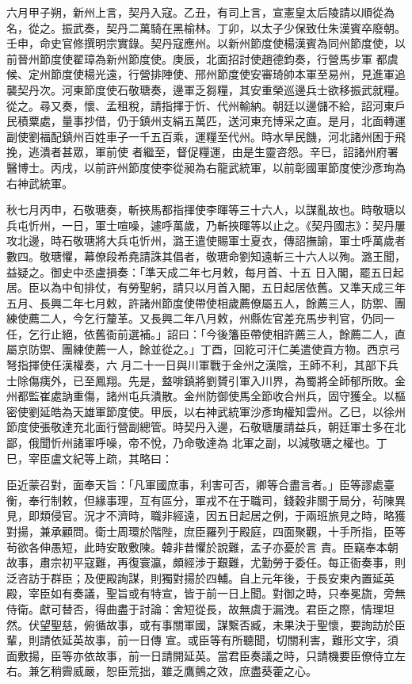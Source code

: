 \begin{pinyinscope}
 六月甲子朔，新州上言，契丹入寇。乙丑，有司上言，宣憲皇太后陵請以順從為名，從之。振武奏，契丹二萬騎在黑榆林。丁卯，以太子少保致仕朱漢賓卒廢朝。壬申，命史官修撰明宗實錄。契丹寇應州。以新州節度使楊漢賓為同州節度使，以前晉州節度使翟璋為新州節度使。庚辰，北面招討使趙德鈞奏，行營馬步軍
 都虞候、定州節度使楊光遠，行營排陣使、邢州節度使安審琦帥本軍至易州，見進軍追襲契丹次。河東節度使石敬瑭奏，邊軍乏芻糧，其安重榮巡邊兵士欲移振武就糧。從之。尋又奏，懷、孟租稅，請指揮于忻、代州輸納。朝廷以邊儲不給，詔河東戶民積粟處，量事抄借，仍于鎮州支絹五萬匹，送河東充博采之直。是月，北面轉運副使劉福配鎮州百姓車子一千五百乘，運糧至代州。時水旱民饑，河北諸州困于飛挽，逃潰者甚眾，軍前使
 者繼至，督促糧運，由是生靈咨怨。辛巳，詔諸州府署醫博士。丙戌，以前許州節度使李從昶為右龍武統軍，以前彰國軍節度使沙彥珣為右神武統軍。



 秋七月丙申，石敬瑭奏，斬挾馬都指揮使李暉等三十六人，以謀亂故也。時敬瑭以兵屯忻州，一日，軍士喧噪，遽呼萬歲，乃斬挾暉等以止之。《契丹國志》：契丹屢攻北邊，時石敬瑭將大兵屯忻州，潞王遣使賜軍士夏衣，傳詔撫諭，軍士呼萬歲者數四。敬瑭懼，幕僚段希堯請誅其倡者，敬瑭命劉知遠斬三十六人以殉。潞王聞，益疑之。御史中丞盧損奏：「準天成二年七月敕，每月首、十五
 日入閣，罷五日起居。臣以為中旬排仗，有勞聖躬，請只以月首入閣，五日起居依舊。又準天成三年五月、長興二年七月敕，許諸州節度使帶使相歲薦僚屬五人，餘薦三人，防禦、團練使薦二人，今乞行釐革。又長興二年八月敕，州縣佐官差充馬步判官，仍同一任，乞行止絕，依舊衙前選補。」詔曰：「今後籓臣帶使相許薦三人，餘薦二人，直屬京防禦、團練使薦一人，餘並從之。」丁酉，回紇可汗仁美遣使貢方物。西京弓弩指揮使任漢權奏，六
 月二十一日與川軍戰于金州之漢陰，王師不利，其部下兵士除傷痍外，已至鳳翔。先是，盩啡鎮將劉贇引軍入川界，為蜀將全師郁所敗。金州都監崔處訥重傷，諸州屯兵潰散。金州防御使馬全節收合州兵，固守獲全。以樞密使劉延皓為天雄軍節度使。甲辰，以右神武統軍沙彥珣權知雲州。乙巳，以徐州節度使張敬達充北面行營副總管。時契丹入邊，石敬瑭屢請益兵，朝廷軍士多在北鄙，俄聞忻州諸軍呼噪，帝不悅，乃命敬達為
 北軍之副，以減敬瑭之權也。丁巳，宰臣盧文紀等上疏，其略曰：



 臣近蒙召對，面奉天旨：「凡軍國庶事，利害可否，卿等合盡言者。」臣等謬處臺衡，奉行制敕，但緣事理，互有區分，軍戎不在于職司，錢穀非關于局分，茍陳異見，即類侵官。況才不濟時，職非經遠，因五日起居之例，于兩班旅見之時，略獲對揚，兼承顧問。衛士周環於階陛，庶臣羅列于殿庭，四面聚觀，十手所指，臣等茍欲各伸愚短，此時安敢敷陳。韓非昔懼於說難，孟子亦憂於言
 責。臣竊奉本朝故事，肅宗初平寇難，再復寰瀛，頗經涉于艱難，尤勤勞于委任。每正衙奏事，則泛咨訪于群臣；及便殿詢謀，則獨對揚於四輔。自上元年後，于長安東內置延英殿，宰臣如有奏議，聖旨或有特宣，皆于前一日上聞。對御之時，只奉冕旒，旁無侍衛。獻可替否，得曲盡于討論：舍短從長，故無虞于漏洩。君臣之際，情理坦然。伏望聖慈，俯循故事，或有事關軍國，謀繫否臧，未果決于聖懷，要詢訪於臣輩，則請依延英故事，前一日傳
 宣。或臣等有所聽聞，切關利害，難形文字，須面敷揚，臣等亦依故事，前一日請開延英。當君臣奏議之時，只請機要臣僚侍立左右。兼乞稍霽威嚴，恕臣荒拙，雖乏鷹鸇之效，庶盡葵藿之心。




\end{pinyinscope}
